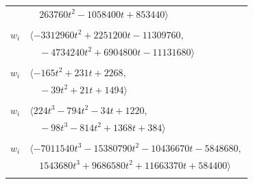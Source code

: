 \documentclass[11pt]{article}
\begin{document}
\begin{longtable}{@{}ll@{}}
 & $\quad 263760t^{2}-1058400t+853440\rangle$\\
\addlinespace[2pt]
\multicolumn{2}{@{}p{0.97\textwidth}@{}}{$i=19$, $D_i=1$, $\rho_{ij}$: $3{:}1, \allowbreak 6{:}1, \allowbreak 9{:}2, \allowbreak 11{:}2, \allowbreak 14{:}2, \allowbreak 16{:}1, \allowbreak 29{:}2, \allowbreak 30{:}1, \allowbreak 31{:}1, \allowbreak 40{:}1, \allowbreak 42{:}1, \allowbreak 44{:}2, \allowbreak 45{:}2, \allowbreak 47{:}2, \allowbreak 52{:}1, \allowbreak 56{:}1, \allowbreak 60{:}2, \allowbreak 61{:}1, \allowbreak 62{:}2, \allowbreak 63{:}2, \allowbreak 65{:}2, \allowbreak 67{:}2, \allowbreak 75{:}1, \allowbreak 77{:}2, \allowbreak 84{:}2, \allowbreak 85{:}2, \allowbreak 96{:}2$}\\
$w_i$ & $\langle -3312960t^{2}+2251200t-11309760,$\\
 & $\quad -4734240t^{2}+6904800t-11131680\rangle$\\
\addlinespace[2pt]
\multicolumn{2}{@{}p{0.97\textwidth}@{}}{$i=20$, $D_i=1$, $\rho_{ij}$: $3{:}1, \allowbreak 6{:}2, \allowbreak 10{:}1, \allowbreak 12{:}2, \allowbreak 22{:}1, \allowbreak 30{:}1, \allowbreak 32{:}2, \allowbreak 55{:}2, \allowbreak 60{:}2, \allowbreak 63{:}2$}\\
$w_i$ & $\langle -165t^{2}+231t+2268,$\\
 & $\quad -39t^{2}+21t+1494\rangle$\\
\addlinespace[2pt]
\multicolumn{2}{@{}p{0.97\textwidth}@{}}{$i=21$, $D_i=1$, $\rho_{ij}$: $2{:}2, \allowbreak 11{:}1, \allowbreak 14{:}2, \allowbreak 18{:}1, \allowbreak 36{:}2, \allowbreak 39{:}1, \allowbreak 41{:}2, \allowbreak 42{:}1, \allowbreak 43{:}1, \allowbreak 45{:}2, \allowbreak 59{:}1, \allowbreak 60{:}1, \allowbreak 61{:}2$}\\
$w_i$ & $\langle 224t^{3}-794t^{2}-34t+1220,$\\
 & $\quad -98t^{3}-814t^{2}+1368t+384\rangle$\\
\addlinespace[2pt]
\multicolumn{2}{@{}p{0.97\textwidth}@{}}{$i=22$, $D_i=1$, $\rho_{ij}$: $5{:}2, \allowbreak 11{:}1, \allowbreak 13{:}2, \allowbreak 15{:}1, \allowbreak 17{:}2, \allowbreak 20{:}2, \allowbreak 24{:}1, \allowbreak 31{:}2, \allowbreak 32{:}2, \allowbreak 39{:}1, \allowbreak 41{:}1, \allowbreak 57{:}2, \allowbreak 59{:}1, \allowbreak 61{:}2, \allowbreak 62{:}2$}\\
$w_i$ & $\langle -7011540t^{3}-15380790t^{2}-10436670t-5848680,$\\
 & $\quad 1543680t^{3}+9686580t^{2}+11663370t+584400\rangle$\\
\addlinespace[2pt]

\end{longtable}
\end{document}
